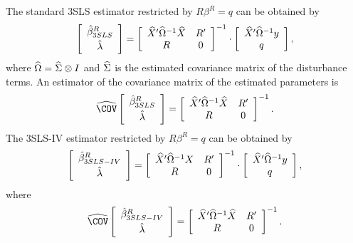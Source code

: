 The standard 3SLS estimator restricted by $R \beta^R = q$ can be obtained by
\begin{equation}
   \left[ \begin{array}{c}
      \hat{\beta}^R_{3SLS} \\[0.2em] \hat{\lambda}
   \end{array} \right]
   =
   \left[ \begin{array}{cc}
      \widehat{X}' \widehat{\Omega}^{-1} \widehat{X} & R' \\
      R & 0
   \end{array} \right]^{-1}
   \cdot
   \left[ \begin{array}{c}
      \widehat{X}' \widehat{\Omega}^{-1} y \\ q
   \end{array} \right] ,
   \label{eq:3slsGlsR}
\end{equation}
where $\widehat{\Omega} = \widehat{\Sigma} \otimes I$ and
$\widehat{\Sigma}$ is the estimated covariance matrix of the disturbance terms.
An estimator of the covariance matrix of the estimated parameters is
\begin{equation}
   \COVHat
   \left[ \begin{array}{c}
      \bHat^R_{3SLS} \\[0.2em] \lHat
   \end{array} \right] 
   = 
   \left[ \begin{array}{cc}
      \XHat' \OHat^{-1} \XHat & R' \\
      R & 0
   \end{array} \right]^{-1} .
   \label{eq:cov3slsr}
\end{equation}
The 3SLS-IV estimator restricted by $R \beta^R = q$ can be obtained by
\begin{equation}
   \left[ \begin{array}{c}
      \hat{\beta}^R_{3SLS-IV} \\[0.2em] \hat{\lambda}
   \end{array} \right]
   =
   \left[ \begin{array}{cc}
      \widehat{X}' \widehat{\Omega}^{-1} X & R' \\
      R & 0
   \end{array} \right]^{-1}
   \cdot
   \left[ \begin{array}{c}
      \widehat{X}' \widehat{\Omega}^{-1} y \\ q
   \end{array} \right] ,
   \label{eq:3slsIvR}
\end{equation}
where
\begin{equation}
   \COVHat
   \left[ \begin{array}{c}
      \bHat^R_{3SLS-IV} \\[0.2em] \lHat
   \end{array} \right] 
   = 
   \left[ \begin{array}{cc}
      \XHat' \OHat^{-1} \XHat & R' \\
      R & 0
   \end{array} \right]^{-1} .
\end{equation}
